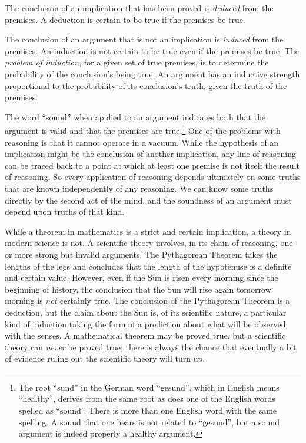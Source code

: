 The conclusion of an implication that has been proved is \emph{deduced} from
the premises. A deduction is certain to be true if the premises be true.

The conclusion of an argument that is not an implication is \emph{induced} from
the premises. An induction is not certain to be true even if the premises be
true. The \emph{problem of induction}, for a given set of true premises, is to
determine the probability of the conclusion's being true.  An argument has an
inductive strength proportional to the probability of its conclusion's truth,
given the truth of the premises.

The word ``sound'' when applied to an argument indicates both that the argument
is valid and that the premises are true.\footnote{%
   The root ``sund'' in the German word ``gesund'', which in English means
   ``healthy'', derives from the same root as does one of the English words
   spelled as ``sound''. There is more than one English word with the same
   spelling. A sound that one hears is not related to ``gesund'', but a sound
   argument is indeed properly a healthy argument.%
}
One of the problems with reasoning is that it cannot operate in a vacuum. While
the hypothesis of an implication might be the conclusion of another
implication, any line of reasoning can be traced back to a point at which at
least one premise is not itself the result of reasoning. So every application
of reasoning depends ultimately on some truths that are known independently of
any reasoning.  We can know some truths directly by the second act of the mind,
and the soundness of an argument must depend upon truths of that kind.

While a theorem in mathematics is a strict and certain implication, a theory in
modern science is not. A scientific theory involves, in its chain of reasoning,
one or more strong but invalid arguments. The Pythagorean Theorem takes the
lengths of the legs and concludes that the length of the hypotenuse is a
definite and certain value. However, even if the Sun is risen every morning
since the beginning of history, the conclusion that the Sun will rise again
tomorrow morning is \emph{not} certainly true.  The conclusion of the
Pythagorean Theorem is a deduction, but the claim about the Sun is, of its
scientific nature, a particular kind of induction taking the form of a
prediction about what will be observed with the senses.  A mathematical theorem
may be proved true, but a scientific theory can \emph{never} be proved true;
there is always the chance that eventually a bit of evidence ruling out the
scientific theory will turn up.

